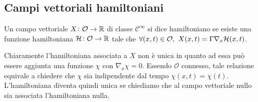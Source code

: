 \subsection{Campi vettoriali hamiltoniani}

\begin{definition}
    Un campo vettoriale $ X \colon \mathcal{O} \to \mathbb{R} $ di classe $ \mathcal{C}^\infty $ si dice hamiltoniano se esiste una funzione hamiltoniana $ \mathcal{H} \colon \mathcal{O} \to \mathbb{R} $ tale che $ \forall (x, t) \in \mathcal{O}, \ X(x, t) = \Gamma \nabla_x \mathcal{H}(x, t) $.
\end{definition}

Chiaramente l'hamiltoniana associata a $ X $ non è unica in quanto ad essa può essere aggiunta una funzione $ \chi $ con $ \nabla_x \chi = 0 $. Essendo $ \mathcal{O} $ connesso, tale relazione equivale a chiedere che $ \chi $ sia indipendente dal tempo $ \chi(x, t) = \chi(t) $. L'hamiltoniana diventa quindi unica se chiediamo che al campo vettoriale nullo sia associata l'hamiltoniana nulla.